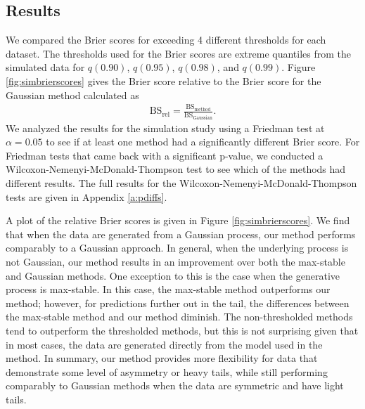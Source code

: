 \documentclass[11pt]{article}
\begin{document}
\subsection{Results}\label{s:simresults}
We compared the Brier scores for exceeding 4 different thresholds for each dataset.
The thresholds used for the Brier scores are extreme quantiles from the simulated data for $q(0.90)$, $q(0.95)$, $q(0.98)$, and $q(0.99)$.
Figure \ref{fig:simbrierscores} gives the Brier score relative to the Brier score for the Gaussian method calculated as
\begin{align}
  \text{BS}_{\text{rel}} = \frac{\text{BS}_{\text{method}}}{\text{BS}_{\text{Gaussian}}}.
\end{align}
We analyzed the results for the simulation study using a Friedman test at $\alpha = 0.05$ to see if at least one method had a significantly different Brier score.
For Friedman tests that came back with a significant p-value, we conducted a Wilcoxon-Nemenyi-McDonald-Thompson test to see which of the methods had different results.
The full results for the Wilcoxon-Nemenyi-McDonald-Thompson tests are given in Appendix \ref{a:pdiffs}.

A plot of the relative Brier scores is given in Figure \ref{fig:simbrierscores}.
We find that when the data are generated from a Gaussian process, our method performs comparably to a Gaussian approach.
In general, when the underlying process is not Gaussian, our method results in an improvement over both the max-stable and Gaussian methods.
One exception to this is the case when the generative process is max-stable.
In this case, the max-stable method outperforms our method; however, for predictions further out in the tail, the differences between the max-stable method and our method diminish.
The non-thresholded methods tend to outperform the thresholded methods, but this is not surprising given that in most cases, the data are generated directly from the model used in the method.
In summary, our method provides more flexibility for data that demonstrate some level of asymmetry or heavy tails, while still performing comparably to Gaussian methods when the data are symmetric and have light tails.
\end{document}
